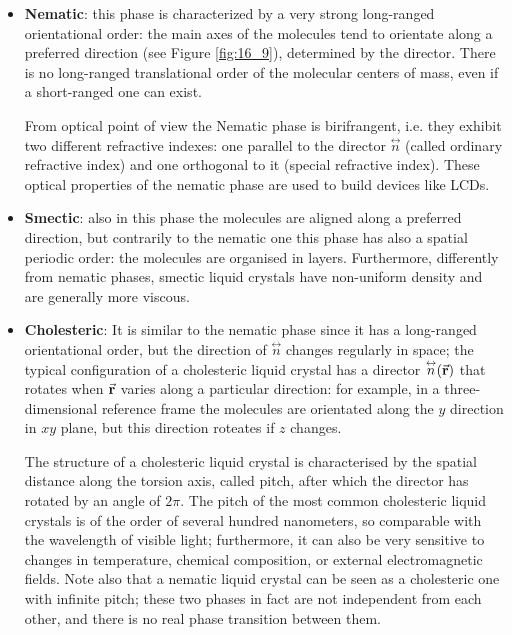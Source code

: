 \documentclass[../main/main.tex]{subfiles}
\begin{document}
\begin{itemize}
\item \textbf{Nematic}: this phase is characterized by a very strong long-ranged orientational order: the main axes of the molecules tend to orientate along a preferred direction (see Figure \ref{fig:16_9}), determined by the director. There is no long-ranged translational order of the molecular centers of mass, even if a short-ranged one can exist.

From optical point of view the Nematic phase is birifrangent, i.e. they exhibit two different refractive indexes: one parallel to the director \( \overset{\leftrightarrow}{n}  \) (called ordinary refractive index) and one orthogonal to it (special refractive index). These optical properties of the nematic phase are used to build devices like LCDs.

\item \textbf{Smectic}: also in this phase the molecules are aligned along a preferred direction, but contrarily to the nematic one this phase has also a spatial periodic order: the molecules are organised in layers. Furthermore, differently from nematic phases, smectic liquid crystals have non-uniform density and are generally more viscous.

\item \textbf{Cholesteric}: It is similar to the nematic phase since it has a long-ranged orientational order, but the direction of \( \overset{\leftrightarrow}{n}\) changes regularly in space; the typical configuration of a cholesteric liquid crystal has a director \( \overset{\leftrightarrow}{n} (\va{r}) \) that rotates when  \( \va{r} \)  varies along a particular direction: for example, in a three-dimensional reference frame the molecules are orientated along the \( y \)  direction in \( xy \)  plane, but this direction roteates if \( z \) changes.

The structure of a cholesteric liquid crystal is characterised by the spatial distance along the torsion axis, called pitch, after which the director has rotated by an angle of \( 2 \pi  \). The pitch of the most common cholesteric liquid crystals is of the order of several hundred nanometers, so comparable with the wavelength of visible light; furthermore, it can also be very sensitive to changes in temperature, chemical composition, or external electromagnetic fields. Note also that a nematic liquid crystal can be seen as a cholesteric one with infinite pitch; these two phases in fact are not independent from each other, and there is no real phase transition between them.

\end{itemize}
\end{document}
